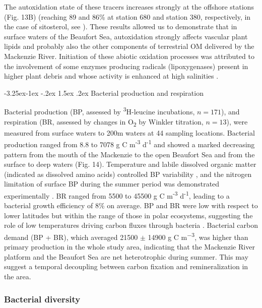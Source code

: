 \documentclass[essd, manuscript]{copernicus}
\makeatletter
\renewcommand\paragraph{\@startsection{paragraph}{4}{\z@}%
                                     {-3.25ex\@plus -1ex \@minus -.2ex}%
                                     {1.5ex \@plus .2ex}%
                                     {\normalfont\normalsize\bfseries}}
\makeatother
\begin{document}
The autoxidation state of these tracers increases strongly at the offshore stations (Fig. 13B) (reaching 89 and 86\% at station 680 and station 380, respectively, in the case of sitosterol, see \citep{Rontani2014}). These results allowed us to demonstrate that in surface waters of the Beaufort Sea, autoxidation strongly affects vascular plant lipids and probably also the other components of terrestrial OM delivered by the Mackenzie River. Initiation of these abiotic oxidation processes was attributed to the involvement of some enzymes producing radicals (lipoxygenases) present in higher plant debris and whose activity is enhanced at high salinities \citep{Galeron2018}. 

\paragraph{Bacterial production and respiration}

Bacterial production (BP, assessed by \textsuperscript{3}H-leucine incubations, $n = 171$), and respiration (BR, assessed by changes in O\textsubscript{2} by Winkler titration, $n = 13$), were measured from surface waters to 200m waters at 44 sampling locations. Bacterial production ranged from 8.8 to 7078 \textmu g C m\textsuperscript{-3} d\textsuperscript{-1} and showed a marked decreasing pattern from the mouth of the Mackenzie to the open Beaufort Sea and from the surface to deep waters (Fig. 14). Temperature and labile dissolved organic matter (indicated as dissolved amino acids) controlled BP variability \citep{Ortega-Retuerta2012a}, and the nitrogen limitation of surface BP during the summer period was demonstrated experimentally \citep{Ortega-Retuerta2012b}. BR ranged from 5500 to 45500 \textmu g C m\textsuperscript{-3} d\textsuperscript{-1}, leading to a bacterial growth efficiency of 8\% on average. BP and BR were low with respect to lower latitudes but within the range of those in polar ecosystems, suggesting the role of low temperatures driving carbon fluxes through bacteria \citep{Kirchman2009}. Bacterial carbon demand (BP + BR), which averaged 21500 $\pm$ 14900 \textmu g C m\textsuperscript{−3}, was higher than primary production in the whole study area, indicating that the Mackenzie River platform and the Beaufort Sea are net heterotrophic during summer. This may suggest a temporal decoupling between carbon fixation and remineralization in the area.

\subsubsection{Bacterial diversity}
\end{document}
